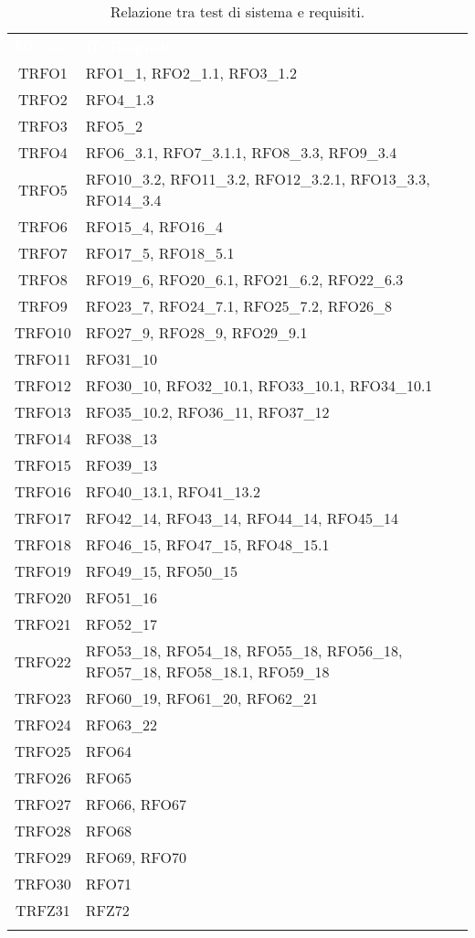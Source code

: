 \begin{longtable}{|c| C{13cm}|}
	\textcolor{white}{\textbf{ID Test}}&
	\textcolor{white}{\textbf{ID Requisito}}\label{tab:TestSistema2}\\
	TRFO1 & RFO1\_1, RFO2\_1.1, RFO3\_1.2\\ \hline
	TRFO2 & RFO4\_1.3\\ \hline
	TRFO3 & RFO5\_2\\ \hline
	TRFO4 & RFO6\_3.1, RFO7\_3.1.1, RFO8\_3.3, RFO9\_3.4\\ \hline
	TRFO5 & RFO10\_3.2, RFO11\_3.2, RFO12\_3.2.1, RFO13\_3.3, RFO14\_3.4\\ \hline
	TRFO6 & RFO15\_4, RFO16\_4\\ \hline
	TRFO7 & RFO17\_5, RFO18\_5.1\\ \hline
	TRFO8 & RFO19\_6, RFO20\_6.1, RFO21\_6.2, RFO22\_6.3\\ \hline
	TRFO9 & RFO23\_7, RFO24\_7.1, RFO25\_7.2, RFO26\_8\\ \hline
	TRFO10 & RFO27\_9, RFO28\_9, RFO29\_9.1\\ \hline
	TRFO11 & RFO31\_10\\ \hline
	TRFO12 & RFO30\_10, RFO32\_10.1, RFO33\_10.1, RFO34\_10.1\\ \hline
	TRFO13 & RFO35\_10.2, RFO36\_11, RFO37\_12\\ \hline
	TRFO14 & RFO38\_13\\ \hline
	TRFO15 & RFO39\_13\\ \hline
	TRFO16 & RFO40\_13.1, RFO41\_13.2\\ \hline
	TRFO17 & RFO42\_14, RFO43\_14, RFO44\_14, RFO45\_14\\ \hline
	TRFO18 & RFO46\_15, RFO47\_15, RFO48\_15.1\\ \hline
	TRFO19 & RFO49\_15, RFO50\_15\\ \hline
	TRFO20 & RFO51\_16\\ \hline
	TRFO21 & RFO52\_17\\ \hline
	TRFO22 & RFO53\_18, RFO54\_18, RFO55\_18, RFO56\_18, RFO57\_18, RFO58\_18.1, RFO59\_18\\ \hline
	TRFO23 & RFO60\_19, RFO61\_20, RFO62\_21\\ \hline
	TRFO24 & RFO63\_22\\ \hline
	TRFO25 & RFO64\\ \hline
	TRFO26 & RFO65\\ \hline
	TRFO27 & RFO66, RFO67\\ \hline
	TRFO28 & RFO68\\ \hline
	TRFO29 & RFO69, RFO70\\ \hline
	TRFO30 & RFO71\\ \hline
	TRFZ31 & RFZ72\\ \hline
	\caption{Relazione tra test di sistema e requisiti.}\\
\end{longtable}
\newpage
